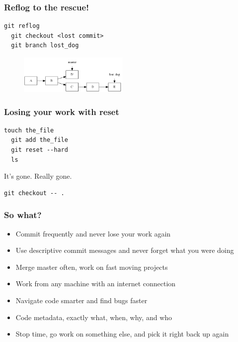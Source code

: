 \documentclass{beamer}
\begin{document}
\begin{frame}[fragile]
\frametitle{Reflog to the rescue!}

\vspace{1em}

\begin{lstlisting}[frame=single]
  git reflog
  git checkout <lost commit>
  git branch lost_dog
\end{lstlisting}

\vspace{1em}

\begin{figure}[p]
  \centering
  \includegraphics[height=5em]{returned.png}
\end{figure}

\end{frame}

\begin{frame}[fragile]
\frametitle{Losing your work with reset}

\begin{lstlisting}[frame=single]
  touch the_file
  git add the_file
  git reset --hard
  ls
\end{lstlisting}

\vspace{1em}

It's gone. Really gone.

\vspace{1em}

\begin{lstlisting}[frame=single]
  git checkout -- .
\end{lstlisting}

\end{frame}

\begin{frame}[fragile]

\frametitle{So what?}

\begin{itemize}
  \item{Commit frequently and never lose your work again}
  \item{Use descriptive commit messages and never forget what you were doing}
  \item{Merge master often, work on fast moving projects}
  \item{Work from any machine with an internet connection}
  \item{Navigate code smarter and find bugs faster}
  \item{Code metadata, exactly what, when, why, and who}
  \item{Stop time, go work on something else, and pick it right back up again}
\end{itemize}
    
\end{frame}
\end{document}
